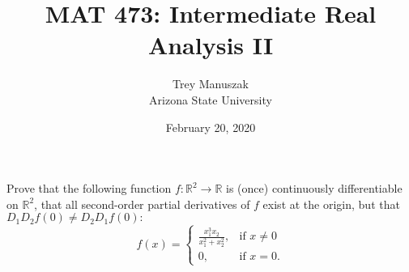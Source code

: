 \documentclass[12pt]{article}
\title{MAT 473: Intermediate Real Analysis II}
\date{February 20, 2020}
\author{Trey Manuszak\\ Arizona State University}
\newenvironment{problem}[2][Problem]{\begin{trivlist}
\item[\hskip \labelsep {\bfseries #1}\hskip \labelsep {\bfseries #2.}]}{\end{trivlist}}
\begin{document}




\maketitle
\newpage





\begin{problem}{17}
Prove that the following function $f : \mathbb{R}^2 \to \mathbb{R}$ is (once) continuously differentiable on $\mathbb{R}^2$, that all second-order partial derivatives of $f$ exist at the origin, but that $D_1D_2f(0) \neq D_2D_1f(0):$ $$f(x) = \begin{cases} 
      \frac{x_1^3x_2}{x_1^2 + x_2^2}, &\text{if } x \neq 0 \\ 0, & \text{if } x = 0. 
   \end{cases}$$
\end{problem}
\end{document}
